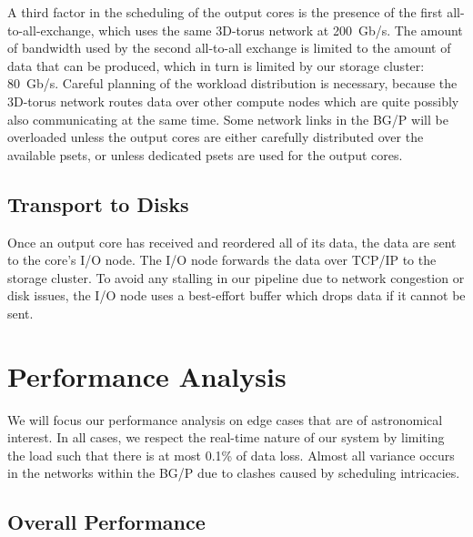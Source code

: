 \documentclass{llncs}
\begin{document}
A third factor in the scheduling of the output cores is the presence of the first all-to-all-exchange, which uses the same 3D-torus network at 200~Gb/s. The amount of bandwidth used by the second all-to-all exchange is limited to the amount of data that can be produced, which in turn is limited by our storage cluster: 80~Gb/s. Careful planning of the workload distribution is necessary, because the 3D-torus network routes data over other compute nodes which are quite possibly also communicating at the same time. Some network links in the BG/P will be overloaded unless the output cores are either carefully distributed over the available psets, or unless dedicated psets are used for the output cores. 

\subsection{Transport to Disks}
Once an output core has received and reordered all of its data, the data are sent to the core's I/O node. The I/O node forwards the data over TCP/IP to the storage cluster. To avoid any stalling in our pipeline due to network congestion or disk issues, the I/O node uses a best-effort buffer which drops data if it cannot be sent.


\section{Performance Analysis}

We will focus our performance analysis on edge cases that are of astronomical interest. In all cases, we respect the real-time nature of our system by limiting the load such that there is at most 0.1\% of data loss. Almost all variance occurs in the networks within the BG/P due to clashes caused by scheduling intricacies.

\subsection{Overall Performance}
\end{document}
